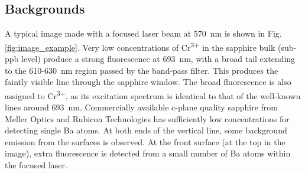 \documentclass[aps,pra,reprint,superscriptaddress]{revtex4-1}
\begin{document}



\subsection{Backgrounds}
\label{sec:backgrounds}



A typical image made with a focused laser beam at 570~nm is shown in Fig. \ref{fig:image_example}.  Very low concentrations of Cr\textsuperscript{3+} in the sapphire bulk (sub-ppb level) produce a strong fluorescence at 693~nm, with a broad tail extending to the 610-630~nm region passed by the band-pass filter.  This produces the faintly visible line through the sapphire window.  The broad fluorescence is also assigned to Cr\textsuperscript{3+}, as its excitation spectrum is identical to that of the well-known lines around 693~nm.  Commercially available c-plane quality sapphire from Meller Optics and Rubicon Technologies has sufficiently low concentrations for detecting single Ba atoms.  At both ends of the vertical line, some background emission from the surfaces is observed.  At the front surface (at the top in the image), extra fluorescence is detected from a small number of Ba atoms within the focused laser.
\end{document}
